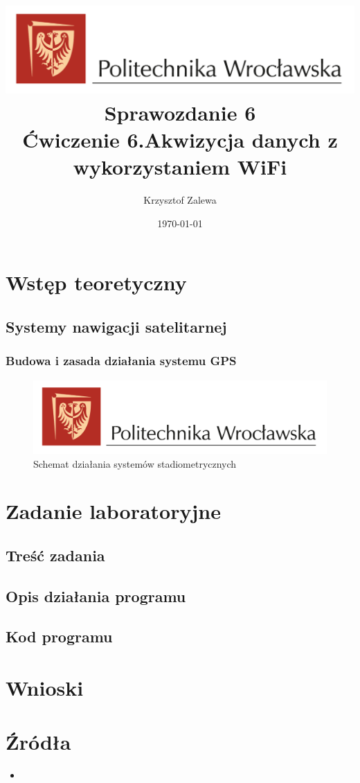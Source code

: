 \documentclass{article}
\title{
  \centering
  \includegraphics[width=\textwidth]{src/images/logo_PWr_kolor_poziom.png}\\
  \fontsize{28pt}{30pt}\selectfont Sprawozdanie 6\\
  \fontsize{14pt}{30pt}\selectfont Ćwiczenie 6.Akwizycja danych z wykorzystaniem WiFi}
\author{Krzysztof Zalewa}
\date{\daymonthyear\today}
\begin{document}
  \maketitle
  \pagebreak
  \tableofcontents
  \pagebreak
  \section{Wstęp teoretyczny}
    \subsection{Systemy nawigacji satelitarnej}
    \subsubsection{Budowa i zasada działania systemu GPS}
    \begin{figure}[ht]
      \centering
      \includegraphics[width=\textwidth]{src/images/logo_PWr_kolor_poziom.png}
      \caption{Schemat działania systemów stadiometrycznych}
      \label{fig:gps}
    \end{figure}
    
  \raggedright
  \section{Zadanie laboratoryjne}
    \subsection{Treść zadania}
    
    \subsection{Opis działania programu}
    
    \subsection{Kod programu}
  \section{Wnioski}

  \section{Źródła}
  \begin{itemize}
    \item 
  \end{itemize}
\end{document}

